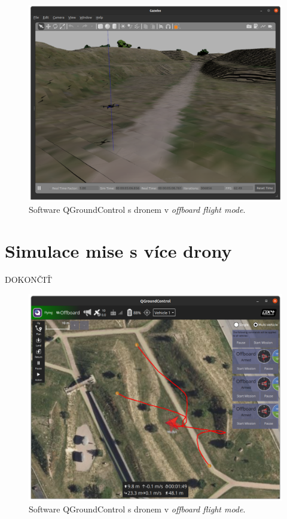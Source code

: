 \begin{figure}[!ht]
  \begin{center}
    \includegraphics[scale=0.3]{obrazky/GAZSIMPLE.png}
  \end{center}
  \caption[Software QGroundControl s dronem v \textit{offboard flight mode}]{Software QGroundControl s dronem v \textit{offboard flight mode}.}
  \label{fig:SIM3GAZ}
\end{figure}


\section{Simulace mise s více drony}

DOKONČIŤ

\begin{figure}[!ht]
  \begin{center}
    \includegraphics[scale=0.33]{obrazky/QGMULTIPLE.png}
  \end{center}
  \caption[Software QGroundControl s dronem v \textit{offboard flight mode}]{Software QGroundControl s dronem v \textit{offboard flight mode}.}
  \label{fig:SIM3MULQG}
\end{figure}

